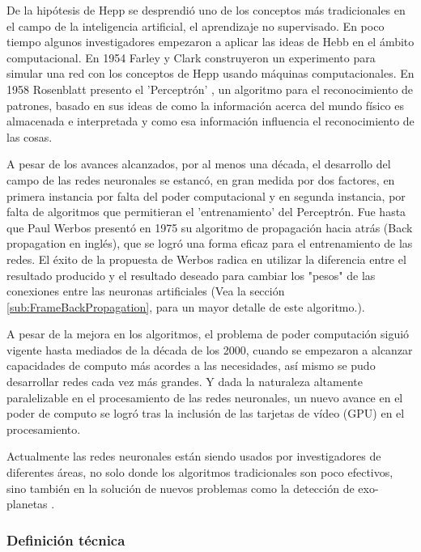             De la hipótesis de Hepp se desprendió uno de los conceptos más tradicionales en el campo de la inteligencia artificial, el aprendizaje no supervisado. En poco tiempo algunos investigadores empezaron a aplicar las ideas de Hebb en el ámbito computacional. En 1954 Farley y Clark \cite{Farley1954} construyeron un experimento para simular una red con los conceptos de Hepp usando máquinas computacionales. En 1958 Rosenblatt presento el 'Perceptrón' \cite{Rosenblatt1958}, un algoritmo para el reconocimiento de patrones, basado en sus ideas de como la información acerca del mundo físico es almacenada e interpretada y como esa información influencia el reconocimiento de las cosas.
            
            A pesar de los avances alcanzados, por al menos una década, el desarrollo del campo de las redes neuronales se estancó, en gran medida por dos factores, en primera instancia por falta del poder computacional y en segunda instancia, por falta de algoritmos que permitieran el 'entrenamiento' del Perceptrón. Fue hasta que Paul Werbos presentó en 1975 su algoritmo de propagación hacia atrás \cite{Werbos1975} (Back propagation en inglés), que se logró una forma eficaz para el entrenamiento de las redes. El éxito de la propuesta de Werbos radica en utilizar la diferencia entre el resultado producido y el resultado deseado para cambiar los "pesos" de las conexiones entre las neuronas artificiales (Vea la sección \ref{sub:FrameBackPropagation}, para un mayor detalle de este algoritmo.).
            
            A pesar de la mejora en los algoritmos, el problema de poder computación siguió vigente hasta mediados de la década de los 2000, cuando se empezaron a alcanzar capacidades de computo más acordes a las necesidades, así mismo se pudo desarrollar redes cada vez más grandes. Y dada la naturaleza altamente paralelizable en el procesamiento de las redes neuronales, un nuevo avance en el poder de computo se logró tras la inclusión de las tarjetas de vídeo (GPU) en el procesamiento.
            
            Actualmente las redes neuronales están siendo usados por investigadores de diferentes áreas, no solo donde los algoritmos tradicionales son poco efectivos, sino también en la solución de nuevos problemas como la detección de exo-planetas \cite{NasaExoplanet2017}. 
            
        \subsubsection{Definición técnica}
        \label{sub2:TecnichialNN}
        
